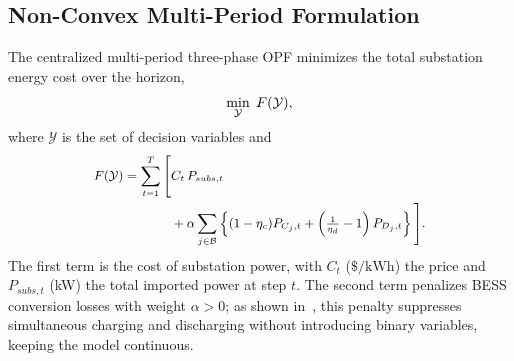 \subsection{Non-Convex Multi-Period Formulation}
\label{ssec:nonconvex}

The centralized multi-period three-phase OPF minimizes the total
substation energy cost over the horizon,
\begin{equation}\label{eq0}
\small
    \min_{\mathcal{Y}}\; F(\mathcal{Y}),
\end{equation}
where $\mathcal{Y}$ is the set of decision variables and
\begin{equation}\label{eq1}
\begin{small}
\begin{aligned}
F(\mathcal{Y})=\sum_{t=1}^{T} \Bigg[
& C_{t}\,P_{subs,t} \\
& + \alpha \sum_{j \in \mathcal{B}} \left\{ (1 - \eta_c) P_{C_j,t}
+ \left( \tfrac{1}{\eta_d} - 1 \right) P_{D_j,t} \right\}
\Bigg].
\end{aligned}
\end{small}
\end{equation}
The first term is the cost of substation power, with $C_t$
($\$/\mathrm{kWh}$) the price and $P_{subs,t}$ (kW) the total imported
power at step $t$. The second term penalizes BESS conversion losses
with weight $\alpha>0$; as shown in~\cite{Nazir}, this penalty
suppresses simultaneous charging and discharging without introducing
binary variables, keeping the model continuous.

